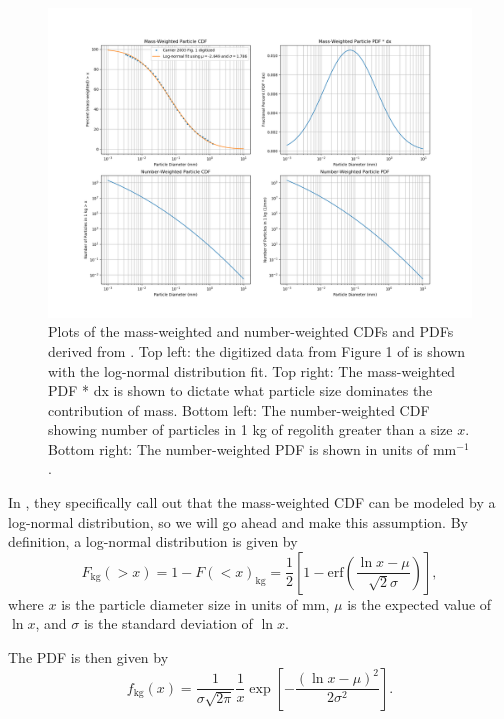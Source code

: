 \documentclass{hitec}
\numberwithin{equation}{section}
\begin{document}
\begin{figure}[h!]
	\centering
	\includegraphics[width=1.1\textwidth]{Carrier2003_CDFs_PDFs.png}
	\caption{Plots of the mass-weighted and number-weighted CDFs and PDFs derived from \cite{carrier2003particle}. Top left: the digitized data from Figure 1 of \cite{carrier2003particle} is shown with the log-normal distribution fit. Top right: The mass-weighted PDF * dx is shown to dictate what particle size dominates the contribution of mass. Bottom left: The number-weighted CDF showing number of particles in 1 kg of regolith greater than a size $x$. Bottom right: The number-weighted PDF is shown in units of mm$^{-1}$.}\label{fig:Carrier2003_CDFs_PDFs}
\end{figure}

In \cite{carrier2003particle}, they specifically call out that the mass-weighted CDF can be modeled by a log-normal distribution, so we will go ahead and make this assumption. By definition, a log-normal distribution is given by
\begin{equation}
	F_{\text{kg}}(>x) = 1 - F(<x)_{\text{kg}} = \frac{1}{2}\left[1 - \text{erf}\left(\frac{\ln x - \mu}{\sqrt{2}\sigma}\right)\right],
\end{equation}
where $x$ is the particle diameter size in units of mm, $\mu$ is the expected value of $\ln x$, and $\sigma$ is the standard deviation of $\ln x$.

The PDF is then given by
\begin{equation}
	f_{\text{kg}}(x) = \frac{1}{\sigma\sqrt{2\pi}}\frac{1}{x}\exp\left[-\frac{(\ln x - \mu)^2}{2\sigma^2}\right].
\end{equation}
\end{document}
